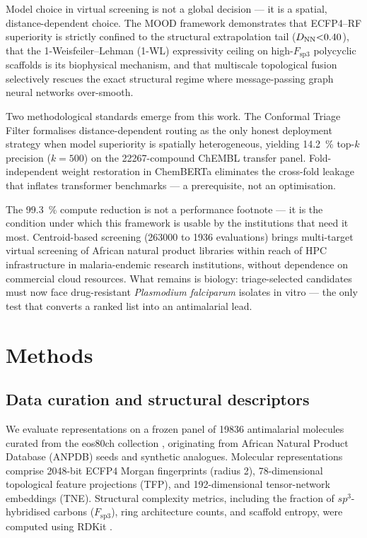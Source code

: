 \documentclass[11pt,a4paper]{article}
\begin{document}
Model choice in virtual screening is not a global decision --- it is a spatial, distance-dependent choice. The MOOD framework demonstrates that ECFP4--RF superiority is strictly confined to the structural extrapolation tail ($D_{\text{NN}}\num{<0.40}$), that the 1-Weisfeiler--Lehman (1-WL) expressivity ceiling on high-$F_{\mathrm{sp3}}$ polycyclic scaffolds is its biophysical mechanism, and that multiscale topological fusion selectively rescues the exact structural regime where message-passing graph neural networks over-smooth.

Two methodological standards emerge from this work. The Conformal Triage Filter formalises distance-dependent routing as the only honest deployment strategy when model superiority is spatially heterogeneous, yielding \qty{+14.2}{\percent} top-$k$ precision ($k=\num{500}$) on the \num{22267}-compound ChEMBL transfer panel. Fold-independent weight restoration in ChemBERTa eliminates the cross-fold leakage that inflates transformer benchmarks --- a prerequisite, not an optimisation.

The \qty{99.3}{\percent} compute reduction is not a performance footnote --- it is the condition under which this framework is usable by the institutions that need it most. Centroid-based screening (\num{263000} to \num{1936} evaluations) brings multi-target virtual screening of African natural product libraries within reach of HPC infrastructure in malaria-endemic research institutions, without dependence on commercial cloud resources. What remains is biology: triage-selected candidates must now face drug-resistant \emph{Plasmodium falciparum} isolates in vitro --- the only test that converts a ranked list into an antimalarial lead.

\section{Methods}

\subsection{Data curation and structural descriptors}

We evaluate representations on a frozen panel of \num{19836} antimalarial molecules curated from the eos80ch collection \citep{temgoua2026antimalarial}, originating from African Natural Product Database (ANPDB) seeds and synthetic analogues. Molecular representations comprise \num{2048}-bit ECFP4 Morgan fingerprints (radius 2), \num{78}-dimensional topological feature projections (TFP), and \num{192}-dimensional tensor-network embeddings (TNE). Structural complexity metrics, including the fraction of $sp^3$-hybridised carbons ($F_{\mathrm{sp3}}$), ring architecture counts, and scaffold entropy, were computed using RDKit \citep{RDKit}.
\end{document}
